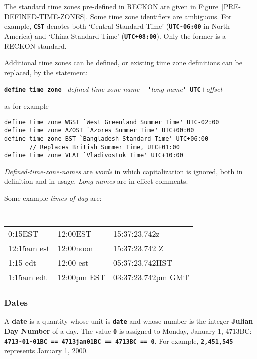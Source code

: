 \documentclass[12pt]{article}
\newcommand{\TT}[1]{{\tt \bfseries #1}}
\newcommand{\key}[1]{{\rm \bfseries #1}}
\newenvironment{indpar}[1][0.3in]%
	{\begin{list}{}%
		     {\setlength{\itemsep}{0in}%
		      \setlength{\topsep}{0in}%
		      \setlength{\parsep}{1ex}%
		      \setlength{\labelwidth}{#1}%
		      \setlength{\leftmargin}{#1}%
		      \addtolength{\leftmargin}{\labelsep}}%
	 \item}%
	{\end{list}}
\begin{document}
The standard time zones pre-defined in RECKON are given in
Figure~\ref{PRE-DEFINED-TIME-ZONES}.
Some time zone identifiers are ambiguous.  For example, \TT{CST}
denotes both `Central Standard Time' (\TT{UTC-06:00} in North America)
and `China Standard Time' (\TT{UTC+08:00}).
Only the former is a RECKON standard.

Additional time zones can be defined, or existing time zone
definitions can be replaced, by the statement:
\begin{center}
\TT{define time zone} ~{\em defined-time-zone-name} ~
    \TT{`}{\em long-name}\TT{' UTC}$\pm${\em offset}
\end{center}

as for example
\begin{indpar}\begin{verbatim}
define time zone WGST `West Greenland Summer Time' UTC-02:00
define time zone AZOST `Azores Summer Time' UTC+00:00
define time zone BST `Bangladesh Standard Time' UTC+06:00
       // Replaces British Summer Time, UTC+01:00
define time zone VLAT `Vladivostok Time' UTC+10:00
\end{verbatim}\end{indpar}

{\em Defined-time-zone-names} are {\em words} in which
capitalization is ignored, both in definition and in usage.
{\em Long-names} are in effect comments.

Some example {\em times-of-day} are:

\begin{indpar}[0.1in]
\tt
\begin{tabular}{@{}l@{~}l@{~}l@{}}
0:15EST			& 12:00EST		& 15:37:23.742z \\
12:15am est		& 12:00noon		& 15:37:23.742 Z \\
1:15 edt		& 12:00 est		& 05:37:23.742HST \\
1:15am edt		& 12:00pm EST		& 03:37:23.742pm GMT \\
\end{tabular}
\end{indpar}

\subsubsection{Dates}
\label{DATES}

A \key{date} is a quantity whose unit is \TT{date}
and whose number is the integer
\key{Julian Day Number} of a day.
The value \TT{0} is assigned to
Monday, January 1, 4713BC:
\TT{4713-01-01BC == 4713jan01BC == 4713BC == 0}.
For example, \TT{2,451,545} represents January 1, 2000.
\end{document}
